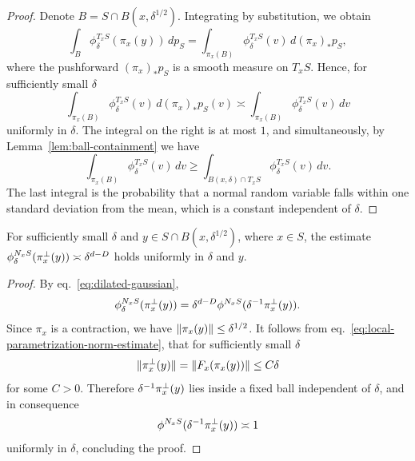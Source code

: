 \begin{proof}
    Denote $B=S\cap B(x,\delta^{1/2})$. Integrating by substitution, we obtain
    \begin{equation}
        \int_B \phi^{T_xS}_\delta(\pi_x(y))\,dp_S = \int_{\pi_x(B)}\phi^{T_xS}_\delta(v) \,d(\pi_x)_*p_S,
    \end{equation}
    where the pushforward $(\pi_x)_*p_S$ is a smooth measure on $T_xS$. Hence, for sufficiently small $\delta$
    \begin{equation}
    \label{eq:approximating-integral-of-tangential-normal-distribution}
        \int_{\pi_x(B)} \phi^{T_xS}_\delta(v) \,d(\pi_x)_*p_S(v) \asymp \int_{\pi_x(B)} \phi^{T_xS}_\delta(v) \,dv
    \end{equation}
    uniformly in $\delta$. The integral on the right is at most $1$, and simultaneously, by Lemma~\ref{lem:ball-containment} we have
    \begin{equation}
        \int_{\pi_x(B)} \phi^{T_xS}_\delta(v) \,dv \geq \int_{B(x,\delta)\cap T_xS} \phi^{T_xS}_\delta(v) \,dv.
    \end{equation}
    The last integral is the probability that a normal random variable falls within one standard deviation from the mean, which is a constant independent of $\delta$.
\end{proof}

\begin{lemma}
\label{lem:normal-gaussian-estimate}
    For sufficiently small $\delta$ and $y\in S\cap B(x, \delta^{1/2})$, where $x\in S$, the estimate $\phi^{N_xS}_\delta(\pi^\perp_x(y)) \asymp \delta^{d-D}$ holds uniformly in $\delta$ and $y$.
\end{lemma}

\begin{proof}
    By eq.~\eqref{eq:dilated-gaussian}, 
    \begin{equation}
        \phi^{N_xS}_\delta(\pi^\perp_x(y)) = \delta^{d-D}\phi^{N_xS}(\delta^{-1}\pi^\perp_x(y)).
    \end{equation}
    Since $\pi_x$ is a contraction, we have $\lVert{\pi_x(y)}\rVert \leq \delta^{1/2}$. It follows from eq.~\eqref{eq:local-parametrization-norm-estimate}, that for sufficiently small $\delta$
    \begin{equation}
        \lVert{\pi^\perp_x(y)}\rVert = \lVert{F_x(\pi_x(y))}\rVert \leq C\delta
    \end{equation}
    for some $C>0$. Therefore $\delta^{-1}\pi^\perp_x(y)$ lies inside a fixed ball independent of $\delta$, and in consequence
    \begin{equation}
        \phi^{N_xS}(\delta^{-1}\pi^\perp_x(y)) \asymp 1
    \end{equation}
    uniformly in $\delta$, concluding the proof.
\end{proof}

